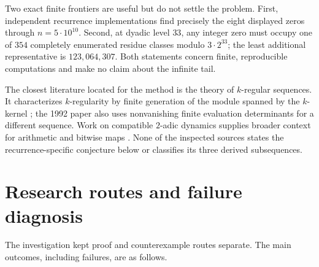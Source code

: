 \documentclass[11pt]{amsart}
\theoremstyle{definition}
\begin{document}
Two exact finite frontiers are useful but do not settle the problem.  First,
independent recurrence implementations find precisely the eight displayed
zeros through $n=5\cdot10^{10}$.  Second, at dyadic level $33$, any integer
zero must occupy one of $354$ completely enumerated residue classes modulo
$3\cdot2^{33}$; the least additional representative is $123{,}064{,}307$.
Both statements concern finite, reproducible computations and make no claim
about the infinite tail.

The closest literature located for the method is the theory of
$k$-regular sequences.  It characterizes $k$-regularity by finite generation
of the module spanned by the $k$-kernel
\cite{AlloucheShallit1992,AlloucheShallit2003}; the 1992 paper also uses
nonvanishing finite evaluation determinants for a different sequence.  Work
on compatible $2$-adic dynamics supplies broader context for arithmetic and
bitwise maps \cite{Anashin2002}.  None of the inspected sources states the
recurrence-specific conjecture below or classifies its three derived
subsequences.

\section{Research routes and failure diagnosis}

The investigation kept proof and counterexample routes separate.  The main
outcomes, including failures, are as follows.
\end{document}

